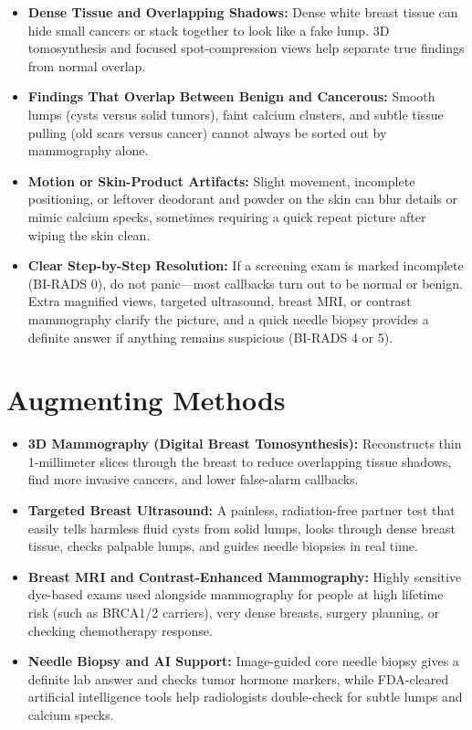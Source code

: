 \begin{itemize}
    \item \textbf{Dense Tissue and Overlapping Shadows:} Dense white breast tissue can hide small cancers or stack together to look like a fake lump. 3D tomosynthesis and focused spot-compression views help separate true findings from normal overlap.
    \item \textbf{Findings That Overlap Between Benign and Cancerous:} Smooth lumps (cysts versus solid tumors), faint calcium clusters, and subtle tissue pulling (old scars versus cancer) cannot always be sorted out by mammography alone.
    \item \textbf{Motion or Skin-Product Artifacts:} Slight movement, incomplete positioning, or leftover deodorant and powder on the skin can blur details or mimic calcium specks, sometimes requiring a quick repeat picture after wiping the skin clean.
    \item \textbf{Clear Step-by-Step Resolution:} If a screening exam is marked incomplete (BI-RADS 0), do not panic---most callbacks turn out to be normal or benign. Extra magnified views, targeted ultrasound, breast MRI, or contrast mammography clarify the picture, and a quick needle biopsy provides a definite answer if anything remains suspicious (BI-RADS 4 or 5).
\end{itemize}

\section{Augmenting Methods}

\begin{itemize}
    \item \textbf{3D Mammography (Digital Breast Tomosynthesis):} Reconstructs thin 1-millimeter slices through the breast to reduce overlapping tissue shadows, find more invasive cancers, and lower false-alarm callbacks.
    \item \textbf{Targeted Breast Ultrasound:} A painless, radiation-free partner test that easily tells harmless fluid cysts from solid lumps, looks through dense breast tissue, checks palpable lumps, and guides needle biopsies in real time.
    \item \textbf{Breast MRI and Contrast-Enhanced Mammography:} Highly sensitive dye-based exams used alongside mammography for people at high lifetime risk (such as BRCA1/2 carriers), very dense breasts, surgery planning, or checking chemotherapy response.
    \item \textbf{Needle Biopsy and AI Support:} Image-guided core needle biopsy gives a definite lab answer and checks tumor hormone markers, while FDA-cleared artificial intelligence tools help radiologists double-check for subtle lumps and calcium specks.
\end{itemize}

